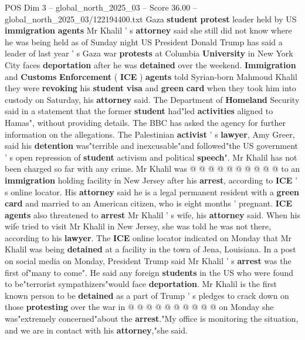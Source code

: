 \begin{textsample}{POS Dim 3 – global\_north\_2025\_03 – Score 36.00 – global\_north\_2025\_03/122194400.txt}  \label{ex:f3_pos_025}
Gaza \textbf{student} \textbf{protest} leader held by US \textbf{immigration} \textbf{agents} Mr Khalil ' s \textbf{attorney} said she still did not know where he was being held as of Sunday night US President Donald Trump has said a leader of last year ' s Gaza war \textbf{protests} at Columbia \textbf{University} in New York City faces \textbf{deportation} after he was \textbf{detained} over the weekend. \textbf{Immigration} and \textbf{Customs} \textbf{Enforcement} ( \textbf{ICE} ) \textbf{agents} told Syrian-born Mahmoud Khalil they were \textbf{revoking} his \textbf{student} \textbf{visa} and \textbf{green} \textbf{card} when they took him into custody on Saturday, his \textbf{attorney} said.
The Department of \textbf{Homeland} Security said in a statement that the former \textbf{student} had"led \textbf{activities} aligned to Hamas", without providing details.
The BBC has asked the agency for further information on the allegations.
The Palestinian \textbf{activist} ' s \textbf{lawyer}, Amy Greer, said his \textbf{detention} was"terrible and inexcusable"and followed"the US government ' s open repression of \textbf{student} activism and political \textbf{speech}".
Mr Khalil has not been charged so far with any crime.
Mr Khalil was @ @ @ @ @ @ @ @ @ @ to an \textbf{immigration} holding facility in New Jersey after his \textbf{arrest}, according to \textbf{ICE} ' s online locator.
His \textbf{attorney} said he is a legal permanent resident with a \textbf{green} \textbf{card} and married to an American citizen, who is eight months ' pregnant. \textbf{ICE} \textbf{agents} also threatened to \textbf{arrest} Mr Khalil ' s wife, his \textbf{attorney} said.
When his wife tried to visit Mr Khalil in New Jersey, she was told he was not there, according to his \textbf{lawyer}.
The \textbf{ICE} online locator indicated on Monday that Mr Khalil was being \textbf{detained} at a facility in the town of Jena, Louisiana.
In a post on social media on Monday, President Trump said Mr Khalil ' s \textbf{arrest} was the first of"many to come".
He said any foreign \textbf{students} in the US who were found to be"terrorist sympathizers"would face \textbf{deportation}.
Mr Khalil is the first known person to be \textbf{detained} as a part of Trump ' s pledges to crack down on those \textbf{protesting} over the war in @ @ @ @ @ @ @ @ @ @ on Monday she was"extremely concerned"about the \textbf{arrest}."My office is monitoring the situation, and we are in contact with his \textbf{attorney},"she said.

\end{textsample}
